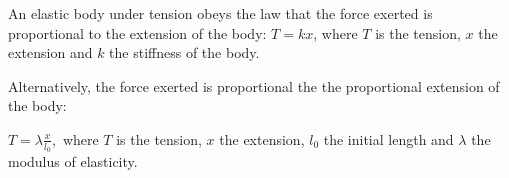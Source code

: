 An elastic body under tension obeys the law that the force
exerted is proportional to the extension of the body: 
$T=kx$, where $T$ is the tension, $x$ the extension and $k$ the stiffness
of the body.
\par
Alternatively, the force exerted is proportional the
the proportional extension of the body:
\par
$ T = \lambda \frac{x}{l_0} , $ where $T$ is the tension,
$x$ the extension, $l_{0}$  the initial length
and $ \lambda $ the modulus of elasticity.